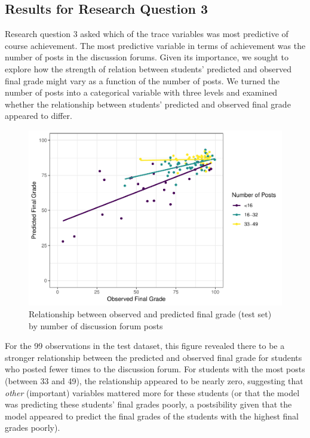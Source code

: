 \documentclass[acmart]{apa6}
\theoremstyle{definition}
\theoremstyle{definition}
\theoremstyle{definition}
\theoremstyle{remark}
\begin{document}
\subsection{Results for Research Question
3}\label{results-for-research-question-3}

Research question 3 asked which of the trace variables was most
predictive of course achievement. The most predictive variable in terms
of achievement was the number of posts in the discussion forums. Given
its importance, we sought to explore how the strength of relation
between students' predicted and observed final grade might vary as a
function of the number of posts. We turned the number of posts into a
categorical variable with three levels and examined whether the
relationship between students' predicted and observed final grade
appeared to differ.

\begin{figure}
\centering
\includegraphics{LAK_Manuscript_files/figure-latex/unnamed-chunk-5-1.pdf}
\caption{\label{fig:unnamed-chunk-5}Relationship between observed and
predicted final grade (test set) by number of discussion forum posts}
\end{figure}

For the 99 observations in the test dataset, this figure revealed there
to be a stronger relationship between the predicted and observed final
grade for students who posted fewer times to the discussion forum. For
students with the most posts (between 33 and 49), the relationship
appeared to be nearly zero, suggesting that \emph{other} (important)
variables mattered more for these students (or that the model was
predicting these students' final grades poorly, a postsibility given
that the model appeared to predict the final grades of the students with
the highest final grades poorly).
\end{document}
